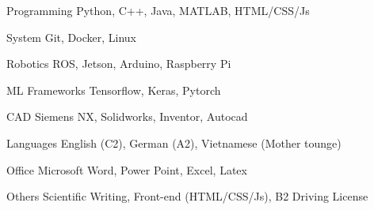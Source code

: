 

\begin{cvskills}

  \cvskill
    {Programming} %
    {Python, C++, Java, MATLAB, HTML/CSS/Js} %

  \cvskill
    {System} %
    {Git, Docker, Linux} %
        
  \cvskill
    {Robotics} %
    {ROS, Jetson, Arduino, Raspberry Pi} %
 
  \cvskill
    {ML Frameworks} %
    {Tensorflow, Keras, Pytorch} %
    
  \cvskill
    {CAD} %
    {Siemens NX, Solidworks, Inventor, Autocad} %
    
  \cvskill
    {Languages} %
    {English (C2), German (A2), Vietnamese (Mother tounge)} %
    
  \cvskill
    {Office} %
    {Microsoft Word, Power Point, Excel, Latex} %

  \cvskill
    {Others} %
    {Scientific Writing, Front-end (HTML/CSS/Js), B2 Driving License} %

\end{cvskills}
